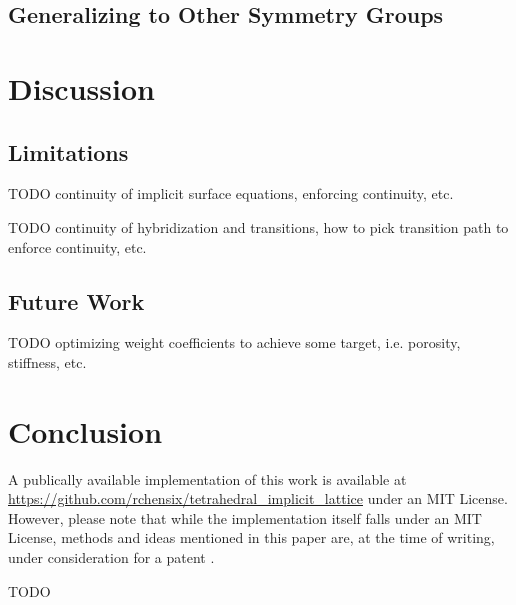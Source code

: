 \documentclass[acmtog]{acmart}
\begin{document}
\subsection{Generalizing to Other Symmetry Groups}

\section{Discussion}
\subsection{Limitations}
TODO continuity of implicit surface equations, enforcing continuity, etc.

TODO continuity of hybridization and transitions, how to pick transition path to enforce continuity, etc.

\subsection{Future Work}
TODO optimizing weight coefficients to achieve some target, i.e. porosity, stiffness, etc.

\section{Conclusion}

A publically available implementation of this work is available at \url{https://github.com/rchensix/tetrahedral_implicit_lattice} under an MIT License. However, please note that while the implementation itself falls under an MIT License, methods and ideas mentioned in this paper are, at the time of writing, under consideration for a patent \cite{chen2022}.

\begin{acks}
TODO
\end{acks}




\appendix
\end{document}
